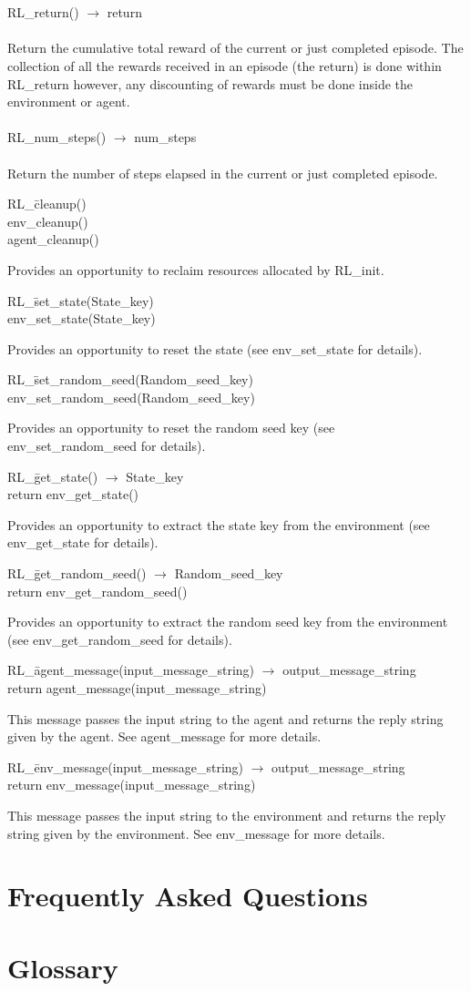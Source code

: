 \documentclass[11pt]{article}
\begin{document}
\\\\
RL\_return() $\rightarrow$ return
\\\\
Return the cumulative total reward of the current or just completed episode.  The collection of all the rewards received in an episode (the return) is done within RL\_return however, any discounting of rewards must be done inside the environment or agent.
\\\\
RL\_num\_steps() $\rightarrow$ num\_steps
\\\\
Return the number of steps elapsed in the current or just completed episode.
\begin{tabbing}
RL\_\=cleanup()\\
\>env\_cleanup()\\
\>agent\_cleanup()
\end{tabbing}
Provides an opportunity to reclaim resources allocated by RL\_init.
\begin{tabbing}
RL\_\=set\_state(State\_key)\\
\>env\_set\_state(State\_key)    
\end{tabbing}
Provides an opportunity to reset the state (see env\_set\_state for details).
\begin{tabbing}
RL\_\=set\_random\_seed(Random\_seed\_key)\\
\>env\_set\_random\_seed(Random\_seed\_key)
\end{tabbing}
Provides an opportunity to reset the random seed key (see env\_set\_random\_seed for details).
\begin{tabbing}
RL\_\=get\_state() $\rightarrow$ State\_key\\
\>return env\_get\_state()  
\end{tabbing}
Provides an opportunity to extract the state key from the environment (see env\_get\_state for details).
\begin{tabbing}
RL\_\=get\_random\_seed() $\rightarrow$ Random\_seed\_key\\
\>return env\_get\_random\_seed()   
\end{tabbing}
Provides an opportunity to extract the random seed key from the environment (see env\_get\_random\_seed for details).               
\begin{tabbing}
RL\_\=agent\_message(input\_message\_string) $\rightarrow$ output\_message\_string\\
\>return agent\_message(input\_message\_string)
\end{tabbing}
This message passes the input string to the agent and returns the reply string given by the agent. See agent\_message for more details.                
\begin{tabbing}
RL\_\=env\_message(input\_message\_string) $\rightarrow$ output\_message\_string\\
\>return env\_message(input\_message\_string)
\end{tabbing}
This message passes the input string to the environment and returns the reply string given by the environment. See env\_message for more details. 

\label{ref}
\section{Frequently Asked Questions}
\section{Glossary}
\end{document}
